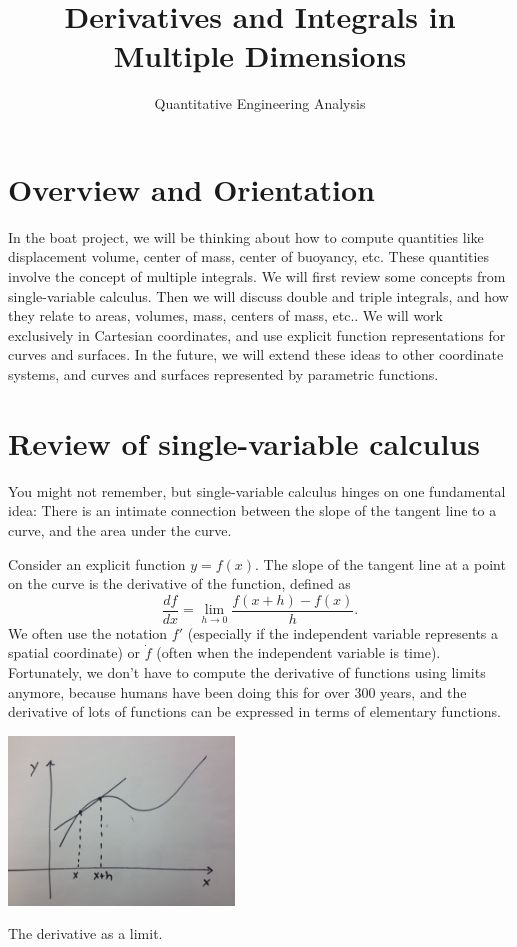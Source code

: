 \documentclass{tufte-handout}
\title{Derivatives and Integrals in Multiple Dimensions}
\author{Quantitative Engineering Analysis}
\date{}
\begin{document}
\maketitle
\thispagestyle{firstpage}

\begin{abstract}

\end{abstract}

\section{Overview and Orientation}

In the boat project, we will be thinking about how to compute quantities like displacement volume, center of mass, center of buoyancy, etc. These quantities involve the concept of multiple integrals. We will first review some concepts from single-variable calculus. Then we will discuss double and triple integrals, and how they relate to areas, volumes, mass, centers of mass, etc.. We will work exclusively in Cartesian coordinates, and use explicit function representations for curves and surfaces. In the future, we will extend these ideas to other coordinate systems, and curves and surfaces represented by parametric functions.

\section{Review of single-variable calculus}

You might not remember, but single-variable calculus hinges on one fundamental idea: There is an intimate connection between the slope of the tangent line to a curve, and the area under the curve.

Consider an explicit function $y=f(x)$. The slope of the tangent line at a point on the curve is the derivative of the function, defined as
\[ \frac{df}{dx}  = \lim_{h \rightarrow 0} \frac{f(x+h) - f(x)}{h}. \]
We often use the notation $f'$ (especially if the independent variable represents a spatial coordinate) or $\dot{f}$ (often when the independent variable is time). Fortunately, we don't have to compute the derivative of functions using limits anymore, because humans have been doing this for over 300 years, and the derivative of lots of functions can be expressed in terms of elementary functions.

\begin{marginfigure}
\includegraphics[width=6cm]{figs/derivative}
\caption{The derivative as a limit.}
\end{marginfigure}
\end{document}
